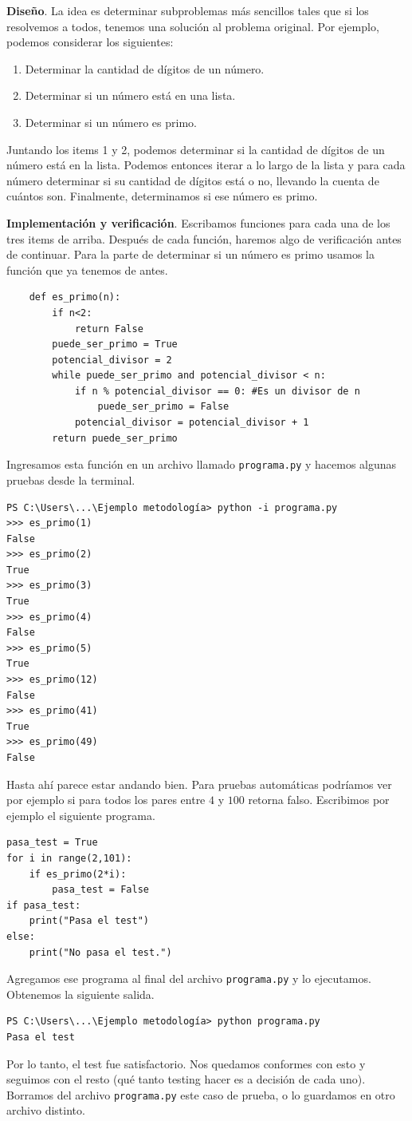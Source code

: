 \documentclass[a4paper, 12pt]{report}
\theoremstyle{definition}
\begin{document}
{\bf Diseño}. La idea es determinar subproblemas más sencillos tales que si los resolvemos a todos, tenemos una solución al problema original. Por ejemplo, podemos considerar los siguientes:
\begin{enumerate}
	\item Determinar la cantidad de dígitos de un número.
	\item Determinar si un número está en una lista.
	\item Determinar si un número es primo.
\end{enumerate}
Juntando los items 1 y 2, podemos determinar si la cantidad de dígitos de un número está en la lista. Podemos entonces iterar a lo largo de la lista y para cada número determinar si su cantidad de dígitos está o no, llevando la cuenta de cuántos son. Finalmente, determinamos si ese número es primo.

{\bf Implementación y verificación}. Escribamos funciones para cada una de los tres items de arriba. Después de cada función, haremos algo de verificación antes de continuar. Para la parte de determinar si un número es primo usamos la función que ya tenemos de antes.

\begin{verbatim}
	def es_primo(n):
	    if n<2:
	        return False
	    puede_ser_primo = True
	    potencial_divisor = 2
	    while puede_ser_primo and potencial_divisor < n:
	        if n % potencial_divisor == 0: #Es un divisor de n
	            puede_ser_primo = False
	        potencial_divisor = potencial_divisor + 1
	    return puede_ser_primo
\end{verbatim}

Ingresamos esta función en un archivo llamado {\tt programa.py} y hacemos algunas pruebas desde la terminal.
\begin{verbatim}
PS C:\Users\...\Ejemplo metodología> python -i programa.py
>>> es_primo(1)
False
>>> es_primo(2)
True
>>> es_primo(3)
True
>>> es_primo(4)
False
>>> es_primo(5)
True
>>> es_primo(12)
False
>>> es_primo(41)
True
>>> es_primo(49)
False
\end{verbatim}
Hasta ahí parece estar andando bien. Para pruebas automáticas podríamos ver por ejemplo si para todos los pares entre $4$ y $100$ retorna falso. Escribimos por ejemplo el siguiente programa.
\begin{verbatim}
pasa_test = True
for i in range(2,101):
    if es_primo(2*i):
        pasa_test = False
if pasa_test:
    print("Pasa el test")
else:
    print("No pasa el test.")
\end{verbatim}
Agregamos ese programa al final del archivo {\tt programa.py} y lo ejecutamos. Obtenemos la siguiente salida.
\begin{verbatim}
PS C:\Users\...\Ejemplo metodología> python programa.py
Pasa el test
\end{verbatim}
Por lo tanto, el test fue satisfactorio. Nos quedamos conformes con esto y seguimos con el resto (qué tanto testing hacer es a decisión de cada uno). Borramos del archivo {\tt programa.py} este caso de prueba, o lo guardamos en otro archivo distinto.
\end{document}
